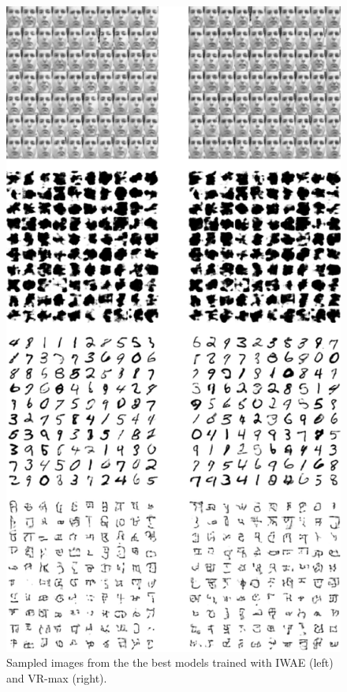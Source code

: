 \begin{figure}[t]
 \centering
 
  \includegraphics[width=0.6\linewidth]{../figs/vae_samples.pdf}
  \caption{Sampled images from the the best models trained with IWAE (left) and VR-max (right).}
  \label{fig:vae_samples}
%

\end{figure}